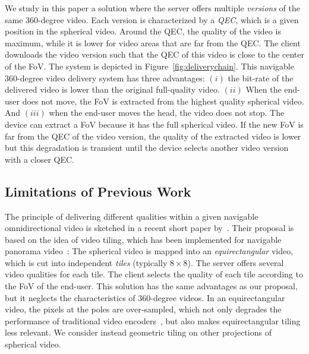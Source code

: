 We study in this paper a solution where the server offers multiple \emph{versions} of the same
360-degree video. Each version is characterized by a \emph{\ac{QEC}}, which is a given
position in the spherical video. Around the \ac{QEC}, the quality of the video is maximum,
while it is lower for video areas that are far from the \ac{QEC}.
The client downloads the video version
such that
the \ac{QEC} of this video is close to the center of the \ac{FoV}.
The system is depicted in Figure~\ref{fig:deliverychain}.
This navigable 360-degree video delivery system has three advantages:
$(i)$ the bit-rate of the delivered video is lower than the original full-quality video.
$(ii)$ When the end-user does not move, the \ac{FoV} is extracted from the highest
quality spherical video.
And $(iii)$ when the end-user moves the head, the video does not stop. The device can
extract
a \ac{FoV} because it has the full spherical video. If the new \ac{FoV} is far from the
\ac{QEC} of the video version, the quality of the extracted video is lower but this
degradation is transient until the
device selects another video version with a closer \ac{QEC}.



\subsection{Limitations of Previous Work}

The principle of delivering different qualities within a given navigable omnidirectional video is sketched
in a recent short paper by~\citet{ochi_live_2015}. Their proposal is based on the idea of video
tiling, which has been implemented for navigable panorama
video~\cite{sanchez_compressed_2015,wang_mixing_2014,gaddam_tiling_2015}:
The spherical video is mapped into an \emph{equirectangular} video, which
is cut into independent \emph{tiles} (typically $8\times 8$). The server offers several
video qualities for each tile. The client selects the quality of each tile according to
the \ac{FoV} of the end-user. This
solution has the same advantages as our proposal, but it neglects
the characteristics of 360-degree
videos. In an equirectangular video, the pixels
at the poles are over-sampled, which not only degrades the
performance of traditional video encoders~\cite{wojciechowski_h.264_2006,yu_framework_2015}, but also
makes equirectangular tiling less relevant. We consider instead geometric tiling on
other projections of spherical video.



